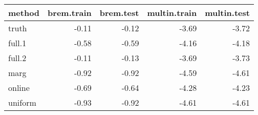\begin{table}[ht]
\begin{center}
\begin{tabular}{lrrrr}
  \hline
method & brem.train & brem.test & multin.train & multin.test \\ 
  \hline
  truth & -0.11 & -0.12 & -3.69 & -3.72 \\ 
  full.1 & -0.58 & -0.59 & -4.16 & -4.18 \\ 
  full.2 & -0.11 & -0.13 & -3.69 & -3.73 \\ 
  marg & -0.92 & -0.92 & -4.59 & -4.61 \\ 
  online & -0.69 & -0.64 & -4.28 & -4.23 \\ 
  uniform & -0.93 & -0.92 & -4.61 & -4.61 \\ 
   \hline
\end{tabular}
\end{center}
\end{table}
